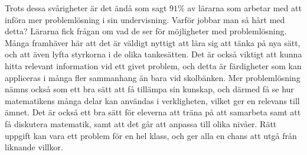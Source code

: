 \textcolor{lila}{Trots dessa svårigheter är det ändå som sagt $91\%$ av lärarna som arbetar med att införa mer problemlösning i sin undervisning. Varför jobbar man så hårt med detta? Lärarna fick frågan om vad de ser för möjligheter med problemlösning. Många framhäver här att det är väldigt nyttigt att lära sig att tänka på nya sätt, och att även lyfta styrkorna i de olika tankesätten. Det är också viktigt att kunna hitta relevant information vid ett givet problem, och detta är färdigheter som kan appliceras i många fler sammanhang än bara vid skolbänken. Mer problemlösning nämns också som ett bra sätt att få tillämpa sin kunskap, och därmed få se hur matematikens många delar kan användas i verkligheten, vilket ger en relevans till ämnet. Det är också ett bra sätt för eleverna att träna på att samarbeta samt att få diskutera matematik, samt att det går att anpassa till olika nivåer. Rätt uppgift kan vara ett problem för en hel klass, och ger alla en chans att utgå från liknande villkor.}